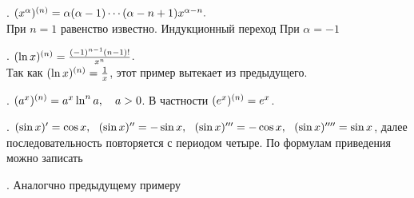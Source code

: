. $(x^\alpha)^{(n)} = \alpha(\alpha - 1)\cdots(\alpha - n + 1)x^{\alpha - n}.$\\
При $n = 1$ равенство известно. Индукционный переход 
При $\alpha = -1$ 

. $(\ln x)^{(n)} = \frac{(-1)^{n - 1} (n - 1)!}{x^n}$.\\
Так как $(\ln x)^{(n)} = \frac 1x$, этот пример вытекает из предыдущего.

. $(a^x)^{(n)} = a^x\ln^n a,\quad a > 0$. В частности $(e^x)^{(n)} = e^x$.

. $(\sin x)' = \cos x,\ \  (\sin x)'' = -\sin x,\ \  (\sin x)''' = -\cos x,\ \  (\sin x)'''' = \sin x$, далее последовательность повторяется с периодом четыре. По формулам приведения можно записать 

. Аналогчно предыдущему примеру 